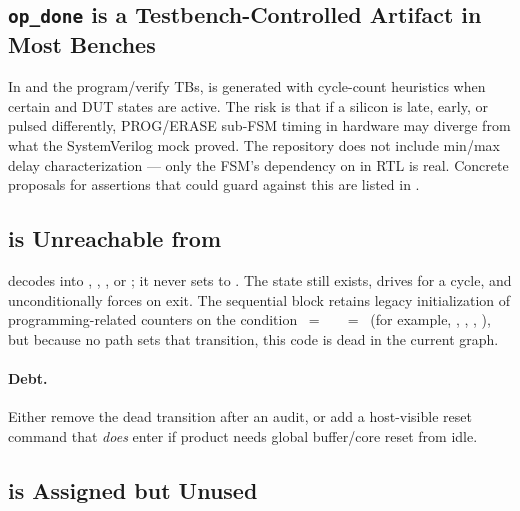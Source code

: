 \subsection{\texttt{op\_done} is a Testbench-Controlled Artifact in Most Benches}
\label{sec:lim-opdone}

In  and the program/verify
TBs,  is generated with cycle-count heuristics when
certain  and DUT states are active. The risk is that
if a silicon  is late, early, or pulsed differently,
PROG/ERASE sub-FSM timing in hardware may diverge from what the
SystemVerilog mock proved. The repository does not include min/max
delay characterization --- only the FSM's dependency on
 in RTL is real. Concrete proposals for assertions
that could guard against this are listed in .

\subsection{ is Unreachable from }
\label{sec:lim-sreset}

 decodes  into ,
, , or ;
it never sets  to . The state
 still exists, drives  for a
cycle, and unconditionally forces  on exit. The
sequential block retains legacy initialization of programming-related
counters on the condition
~=~~\sv{\&\&}~~=~
(for example, , ,
, ), but because no
path sets that transition, this code is dead in the current graph.

\paragraph{Debt.}
Either remove the dead transition after an audit, or add a host-visible
reset command that \emph{does} enter  if product
needs global buffer/core reset from idle.

\subsection{ is Assigned but Unused}
\label{sec:lim-weightreaden}

